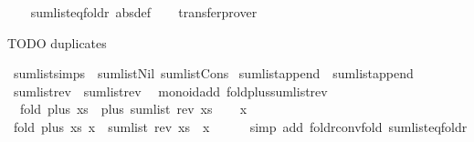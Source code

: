 \begin{isabellebody}
%
\isadelimproof
\ \ %
\endisadelimproof
%
\isatagproof
{}\isamarkupfalse%
\ sum{\isacharunderscore}{\kern0pt}list{\isachardot}{\kern0pt}eq{\isacharunderscore}{\kern0pt}foldr\ {\isacharbrackleft}{\kern0pt}abs{\isacharunderscore}{\kern0pt}def{\isacharbrackright}{\kern0pt}\isanewline
\ \ \isamarkupfalse%
\ transfer{\isacharunderscore}{\kern0pt}prover%
\endisatagproof
{\isafoldproof}%
%
\isadelimproof
\isanewline
%
\endisadelimproof
\isanewline
{}\isamarkupfalse%
%
\begin{isamarkuptext}%
TODO duplicates%
\end{isamarkuptext}\isamarkuptrue%
\isamarkupfalse%
\ sum{\isacharunderscore}{\kern0pt}list{\isacharunderscore}{\kern0pt}simps\ {\isacharequal}{\kern0pt}\ sum{\isacharunderscore}{\kern0pt}list{\isachardot}{\kern0pt}Nil\ sum{\isacharunderscore}{\kern0pt}list{\isachardot}{\kern0pt}Cons\isanewline
{}\isamarkupfalse%
\ sum{\isacharunderscore}{\kern0pt}list{\isacharunderscore}{\kern0pt}append\ {\isacharequal}{\kern0pt}\ sum{\isacharunderscore}{\kern0pt}list{\isachardot}{\kern0pt}append\isanewline
{}\isamarkupfalse%
\ sum{\isacharunderscore}{\kern0pt}list{\isacharunderscore}{\kern0pt}rev\ {\isacharequal}{\kern0pt}\ sum{\isacharunderscore}{\kern0pt}list{\isachardot}{\kern0pt}rev\isanewline
\isanewline
{}\isamarkupfalse%
\ {\isacharparenleft}{\kern0pt}\ monoid{\isacharunderscore}{\kern0pt}add{\isacharparenright}{\kern0pt}\ fold{\isacharunderscore}{\kern0pt}plus{\isacharunderscore}{\kern0pt}sum{\isacharunderscore}{\kern0pt}list{\isacharunderscore}{\kern0pt}rev{\isacharcolon}{\kern0pt}\isanewline
\ \ {\isachardoublequoteopen}fold\ plus\ xs\ {\isacharequal}{\kern0pt}\ plus\ {\isacharparenleft}{\kern0pt}sum{\isacharunderscore}{\kern0pt}list\ {\isacharparenleft}{\kern0pt}rev\ xs{\isacharparenright}{\kern0pt}{\isacharparenright}{\kern0pt}{\isachardoublequoteclose}\isanewline
%
\isadelimproof
%
\endisadelimproof
%
\isatagproof
{}\isamarkupfalse%
\isanewline
\ \ \isamarkupfalse%
\ x\isanewline
\ \ \isamarkupfalse%
\ {\isachardoublequoteopen}fold\ plus\ xs\ x\ {\isacharequal}{\kern0pt}\ sum{\isacharunderscore}{\kern0pt}list\ {\isacharparenleft}{\kern0pt}rev\ xs\ {\isacharat}{\kern0pt}\ {\isacharbrackleft}{\kern0pt}x{\isacharbrackright}{\kern0pt}{\isacharparenright}{\kern0pt}{\isachardoublequoteclose}\isanewline
\ \ \ \ \isamarkupfalse%
\ {\isacharparenleft}{\kern0pt}simp\ add{\isacharcolon}{\kern0pt}\ foldr{\isacharunderscore}{\kern0pt}conv{\isacharunderscore}{\kern0pt}fold\ sum{\isacharunderscore}{\kern0pt}list{\isachardot}{\kern0pt}eq{\isacharunderscore}{\kern0pt}foldr{\isacharparenright}{\kern0pt}\isanewline

\end{isabellebody}

